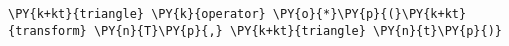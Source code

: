 \begin{Verbatim}[commandchars=\\\{\}]
  \PY{k+kt}{triangle} \PY{k}{operator} \PY{o}{*}\PY{p}{(}\PY{k+kt}{transform} \PY{n}{T}\PY{p}{,} \PY{k+kt}{triangle} \PY{n}{t}\PY{p}{)}
\end{Verbatim}
